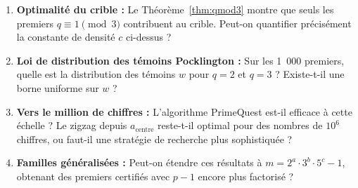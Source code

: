 \documentclass[12pt,a4paper]{article}
\theoremstyle{definition}
\begin{document}
\begin{enumerate}
  \item \textbf{Optimalité du crible :}
    Le Théorème~\ref{thm:qmod3} montre que seuls les premiers
    $q \equiv 1 \pmod{3}$ contribuent au crible.
    Peut-on quantifier précisément la constante de densité $c$ ci-dessus ?

  \item \textbf{Loi de distribution des témoins Pocklington :}
    Sur les 1~000 premiers, quelle est la distribution
    des témoins $w$ pour $q=2$ et $q=3$ ?
    Existe-t-il une borne uniforme sur $w$ ?

  \item \textbf{Vers le million de chiffres :}
    L'algorithme PrimeQuest est-il efficace à cette échelle ?
    Le zigzag depuis $a_{\text{centre}}$ reste-t-il optimal
    pour des nombres de $10^6$ chiffres,
    ou faut-il une stratégie de recherche plus sophistiquée ?

  \item \textbf{Familles généralisées :}
    Peut-on étendre ces résultats à $m = 2^a \cdot 3^b \cdot 5^c - 1$,
    obtenant des premiers certifiés avec $p - 1$ encore plus factorisé ?
\end{enumerate}

\end{document}
